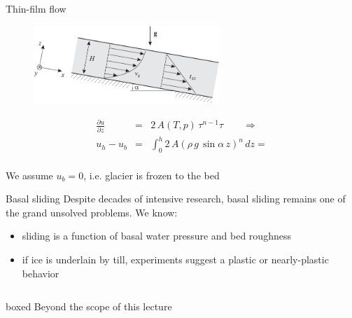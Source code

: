 \documentclass[hide notes,intlimits]{beamer}
\begin{document}
\begin{frame}{Thin-film flow}
  \begin{figure}
    \includegraphics[width=7cm]{figures/fig_3_11}
  \end{figure}
  \begin{equation*}
    \begin{array}{ccl}
      \frac{\partial u}{\partial z}  & = &  2\,A(T,p)\,\tau^{n-1}\tau \qquad \Rightarrow \\[1em]
      u_{h} - u_{b} &  = & \int_{0}^{h} 2\,A\left(\rho\,g\,\sin{\alpha}\,z\right)^{n}\,dz =
    \end{array}
  \end{equation*}
  \\[.75em]
  We assume $u_b=0$, i.e. glacier is frozen to the bed
\end{frame}


\begin{frame}{Basal sliding}
  Despite decades of intensive research, basal sliding remains one of the grand unsolved problems. We know:
  \begin{itemize}
  \item sliding is a function of basal water pressure and bed roughness
  \item if ice is underlain by till, experiments suggest a plastic or nearly-plastic behavior
  \end{itemize}
  \vspace{1em}
  \begin{columns}
    \column[C]{7.5cm}
    \begin{beamercolorbox}[rounded=true,shadow=true]{boxed}
      Beyond the scope of this lecture
    \end{beamercolorbox}
  \end{columns}
\end{frame}

\end{document}
